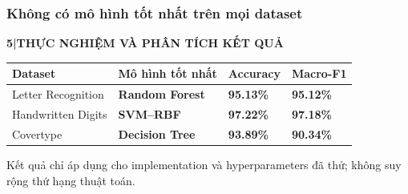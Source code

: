 \documentclass[aspectratio=169,12pt]{beamer}
\newcommand{\chaptertag}[2]{%
  \vspace{-0.16cm}%
  {\scriptsize\bfseries\textcolor{boxframe}{#1\enspace |\enspace #2}}\par
  \vspace{0.12cm}%
}
\begin{document}
\begin{frame}
  \frametitle{Không có mô hình tốt nhất trên mọi dataset}
  \chaptertag{5}{THỰC NGHIỆM VÀ PHÂN TÍCH KẾT QUẢ}
  \small
  \begin{tabular}{@{}L{3.1cm}L{2.7cm}C{1.8cm}C{1.8cm}@{}}
    \toprule
    \textbf{Dataset} & \textbf{Mô hình tốt nhất} & \textbf{Accuracy} & \textbf{Macro-F1} \\
    \midrule
    Letter Recognition & \textcolor{primaryblue}{\textbf{Random Forest}} & \textbf{95.13\%} & \textbf{95.12\%} \\
    Handwritten Digits & \textcolor{primaryblue}{\textbf{SVM--RBF}} & \textbf{97.22\%} & \textbf{97.18\%} \\
    Covertype & \textcolor{boxframe}{\textbf{Decision Tree}} & \textbf{93.89\%} & \textbf{90.34\%} \\
    \bottomrule
  \end{tabular}
  \par\vspace{0.35cm}
  \begin{tcolorbox}[riskbox,width=0.91\textwidth,top=2mm,bottom=2mm]
    \centering
    Kết quả chỉ áp dụng cho implementation và hyperparameters đã thử; không suy rộng thứ hạng thuật toán.
  \end{tcolorbox}
\end{frame}
\end{document}
